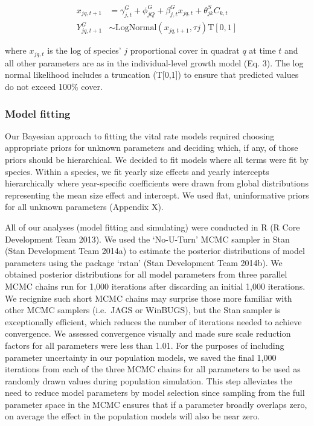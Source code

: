 \documentclass[12pt,]{article}
\begin{document}
\begin{align}
x_{jq,t+1} &= \gamma^{G}_{j,t} + \phi^{G}_{jQ} + \beta^{G}_{j,t}x_{jq,t} + \theta^{S}_{jk}C_{k,t} \\
Y^{G}_{jq,t+1} &\sim \text{LogNormal}(x_{jq,t+1}, \tau{j}) \text{T}[0,1]
\end{align}

where $x_{jq,t}$ is the log of species' $j$ proportional cover in
quadrat $q$ at time $t$ and all other parameters are as in the
individual-level growth model (Eq. 3). The log normal likelihood
includes a truncation (T{[}0,1{]}) to ensure that predicted values do
not exceed 100\% cover.

\subsubsection{Model fitting}\label{model-fitting}

Our Bayesian approach to fitting the vital rate models required choosing
appropriate priors for unknown parameters and deciding which, if any, of
those priors should be hierarchical. We decided to fit models where all
terms were fit by species. Within a species, we fit yearly size effects
and yearly intercepts hierarchically where year-specific coefficients
were drawn from global distributions representing the mean size effect
and intercept. We used flat, uninformative priors for all unknown
parameters (Appendix X).

All of our analyses (model fitting and simulating) were conducted in R
(R Core Development Team 2013). We used the `No-U-Turn' MCMC sampler in
Stan (Stan Development Team 2014a) to estimate the posterior
distributions of model parameters using the package `rstan' (Stan
Development Team 2014b). We obtained posterior distributions for all
model parameters from three parallel MCMC chains run for 1,000
iterations after discarding an initial 1,000 iterations. We recignize
such short MCMC chains may surprise those more familiar with other MCMC
samplers (i.e.~JAGS or WinBUGS), but the Stan sampler is exceptionally
efficient, which reduces the number of iterations needed to achieve
convergence. We assessed convergence visually and made sure scale
reduction factors for all parameters were less than 1.01. For the
purposes of including parameter uncertainty in our population models, we
saved the final 1,000 iterations from each of the three MCMC chains for
all parameters to be used as randomly drawn values during population
simulation. This step alleviates the need to reduce model parameters by
model selection since sampling from the full parameter space in the MCMC
ensures that if a parameter broadly overlaps zero, on average the effect
in the population models will also be near zero.
\end{document}
